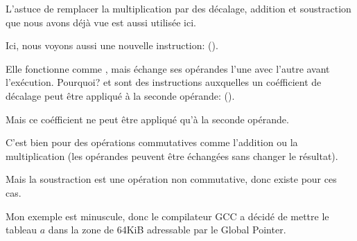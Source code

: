 L'astuce de remplacer la multiplication par des décalage, addition et soustraction
que nous avons déjà vue est aussi utilisée ici.

Ici, nous voyons aussi une nouvelle instruction: \RSB ().

Elle fonctionne comme \SUB, mais échange ses opérandes l'une avec l'autre avant l'exécution.
Pourquoi?
\SUB et \RSB sont des instructions auxquelles un coéfficient de décalage peut être
appliqué à la seconde opérande: ().

Mais ce coéfficient ne peut être appliqué qu'à la seconde opérande.

C'est bien pour des opérations commutatives comme l'addition ou la multiplication
(les opérandes peuvent être échangées sans changer le résultat).

Mais la soustraction est une opération non commutative, donc \RSB existe pour ces
cas.


Mon exemple est minuscule, donc le compilateur GCC a décidé de mettre le tableau
$a$ dans la zone de 64KiB adressable par le Global Pointer.



